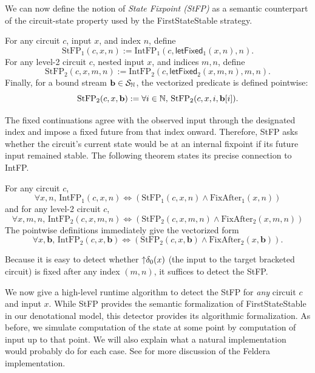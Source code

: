 We can now define the notion of \emph{State Fixpoint (StFP)} as a semantic counterpart of the circuit-state property used by the FirstStateStable strategy.
\begin{definition}
    For any circuit $c$, input $x$, and index $n$, define
    \[
    \text{StFP}_1(c,x,n) :=
    \text{IntFP}_1(c,\mathsf{letFixed}_1(x,n),n).
    \]
    For any level-2 circuit $c$, nested input $x$, and indices $m,n$, define
    \[
    \text{StFP}_2(c,x,m,n) :=
    \text{IntFP}_2(c,\mathsf{letFixed}_2(x,m,n),m,n).
    \]
    Finally, for a bound stream $\mathbf{b} \in \mathcal{S}_{\mathbb{N}}$, the vectorized predicate is defined pointwise:
    \[
    \text{StFP}_2(c,x,\mathbf{b}) :=
    \forall i \in \mathbb{N},\, \text{StFP}_2(c,x,i,\mathbf{b}[i]).
    \]
\end{definition}

The fixed continuations agree with the observed input through the designated index and impose a fixed future from that index onward. Therefore, StFP asks whether the circuit's current state would be at an internal fixpoint if its future input remained stable. The following theorem states its precise connection to IntFP.
\begin{theorem}
    For any circuit $c$,
    \[\forall x, n, \, \text{IntFP}_1(c, x, n) \iff (\text{StFP}_1(c, x, n) \land \text{FixAfter}_1(x, n))\]
    and for any level-2 circuit $c$,
    \[\forall x, m, n, \, \text{IntFP}_2(c, x, m, n) \iff (\text{StFP}_2(c, x, m, n) \land \text{FixAfter}_2(x, m, n))\]
    The pointwise definitions immediately give the vectorized form
    \[\forall x, \mathbf{b}, \, \text{IntFP}_2(c, x, \mathbf{b}) \iff (\text{StFP}_2(c, x, \mathbf{b}) \land \text{FixAfter}_2(x, \mathbf{b})).\]
\end{theorem}
Because it is easy to detect whether ${\uparrow}\delta_0(x)$ (the input to the target bracketed circuit) is fixed after any index $(m, n)$, it suffices to detect the StFP.

We now give a high-level runtime algorithm to detect the StFP for \emph{any} circuit $c$ and input $x$. While StFP provides the semantic formalization of FirstStateStable in our denotational model, this detector provides its algorithmic formalization. As before, we simulate computation of the state at some point by computation of input up to that point. We will also explain what a natural implementation would probably do for each case. See  for more discussion of the Feldera implementation.

